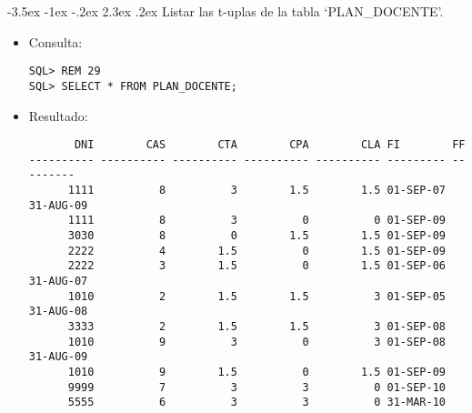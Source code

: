 \documentclass[11pt]{report}
\makeatletter
\renewcommand\chapter{\@startsection{chapter}{0}{\z@}%
    {-3.5ex \@plus -1ex \@minus -.2ex}%
    {2.3ex \@plus.2ex}%
    {\normalfont\Large\bfseries}}
\makeatother
\begin{document}
\chapter{Listar las t-uplas de la tabla ‘PLAN\_DOCENTE’.}
\begin{itemize}
  \item Consulta:
  \begin{verbatim}
SQL> REM 29
SQL> SELECT * FROM PLAN_DOCENTE;
  \end{verbatim}
  \item{Resultado:}
  \begin{verbatim}
       DNI        CAS        CTA        CPA        CLA FI        FF                                                                                                                                     
---------- ---------- ---------- ---------- ---------- --------- ---------                                                                                                                              
      1111          8          3        1.5        1.5 01-SEP-07 31-AUG-09                                                                                                                              
      1111          8          3          0          0 01-SEP-09                                                                                                                                        
      3030          8          0        1.5        1.5 01-SEP-09                                                                                                                                        
      2222          4        1.5          0        1.5 01-SEP-09                                                                                                                                        
      2222          3        1.5          0        1.5 01-SEP-06 31-AUG-07                                                                                                                              
      1010          2        1.5        1.5          3 01-SEP-05 31-AUG-08                                                                                                                              
      3333          2        1.5        1.5          3 01-SEP-08                                                                                                                                        
      1010          9          3          0          3 01-SEP-08 31-AUG-09                                                                                                                              
      1010          9        1.5          0        1.5 01-SEP-09                                                                                                                                        
      9999          7          3          3          0 01-SEP-10                                                                                                                                        
      5555          6          3          3          0 31-MAR-10                                                                                                                                        


\end{verbatim}
\end{itemize}
\end{document}
